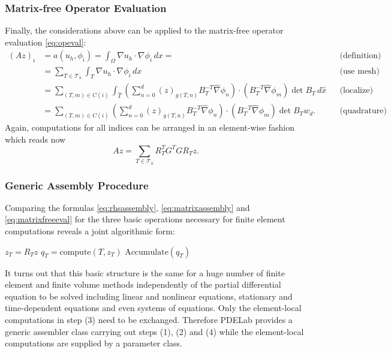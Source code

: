 \documentclass[a4paper,
		     11pt,
		     DIV12,
		     DIVcalc,
		     headings=normal,
		     oneside,
		     bibliography=totoc,
		     headsepline=false,
		     headinclude]{scrartcl}
\begin{document}
\subsubsection*{Matrix-free Operator Evaluation}

Finally, the considerations above can be applied to the matrix-free operator
evaluation \eqref{eq:opeval}:
\begin{align*}
(Az)_i  &= a(u_h,\phi_i) =  \int_\Omega \nabla u_h \cdot \nabla \phi_i \,dx =
&&\text{(definition)} \\ 
&= \sum_{T\in\mathcal{T}_h} \int_T \nabla u_h \cdot \nabla \phi_i \,dx
&&\text{(use mesh)}\\
&= \sum_{(T,m)\in C(i)}
\int_{\hat T} 
\left(\sum_{n=0}^d (z)_{g(T,n)} B_T^{-T} \hat\nabla\phi_n\right)
\cdot (B_T^{-T} \hat\nabla\phi_m) \det B_T \,d\hat x &&\text{(localize)}\\
&= \sum_{(T,m)\in C(i)}
\left(\sum_{n=0}^d (z)_{g(T,n)} B_T^{-T} \hat\nabla\phi_n\right)
\cdot (B_T^{-T} \hat\nabla\phi_m) \det B_T w_d . &&\text{(quadrature)}
\end{align*}
Again, computations for all indices can be arranged in an element-wise fashion
which reads now
\begin{equation}
Az =  \sum_{T\in\mathcal{T}_h} R_T^T G^T G R_T z.
\label{eq:matrixfreeeval}
\end{equation}

\subsubsection*{Generic Assembly Procedure}

Comparing the formulas \eqref{eq:rhsassembly}, \eqref{eq:matrixassembly}
and \eqref{eq:matrixfreeeval} for the three basic operations necessary for
finite element computations reveals a joint algorithmic form:
\begin{algorithmic}[1]
 
\State $z_T = R_T z$ 
\State $q_T=\text{compute}(T,z_T)$ 
\State $\text{Accumulate}(q_T)$ 
\EndFor
\end{algorithmic}

It turns out that this basic structure is the same for a huge number
of  finite element and finite volume methods independently of
the partial differential equation to be solved including linear
and nonlinear equations, stationary and time-dependent equations
and even systems of equations. Only the element-local
computations in step (3) need to be exchanged. Therefore PDELab
provides a generic assembler class carrying out steps (1), (2) and (4)
while the element-local computations are supplied by a parameter class.
\end{document}
